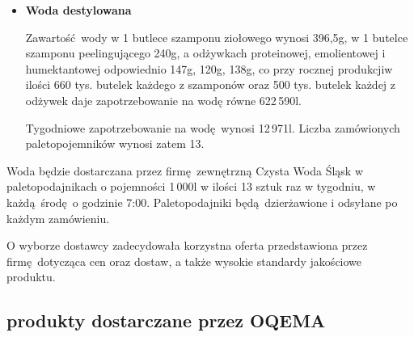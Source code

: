 \begin{itemize}
	\item \textbf{Woda destylowana}

	Zawartość wody w 1 butlece szamponu ziołowego wynosi 396,5g, w 1 butelce szamponu peelingującego 240g, a odżywkach proteinowej, emolientowej i humektantowej odpowiednio 147g, 120g, 138g, co przy rocznej produkcjiw ilości 660 tys. butelek każdego z szamponów oraz 500 tys. butelek każdej z odżywek daje zapotrzebowanie na wodę równe 622\,590l.

		Tygodniowe zapotrzebowanie na wodę wynosi 12\,971l. Liczba zamówionych paletopojemników wynosi zatem 13.
\end{itemize}\vspace{\baselineskip}

		Woda będzie dostarczana przez firmę zewnętrzną \textsf{Czysta Woda Śląsk} w paletopodajnikach o pojemności 1\,000l w ilości 13 sztuk raz w tygodniu, w każdą środę o godzinie 7:00. Paletopodajniki będą dzierżawione i odsyłane po każdym zamówieniu.

		O wyborze dostawcy zadecydowała korzystna oferta przedstawiona przez firmę dotycząca cen oraz dostaw, a także wysokie standardy jakościowe produktu.


\subsection{produkty dostarczane przez \textsf{OQEMA}}


